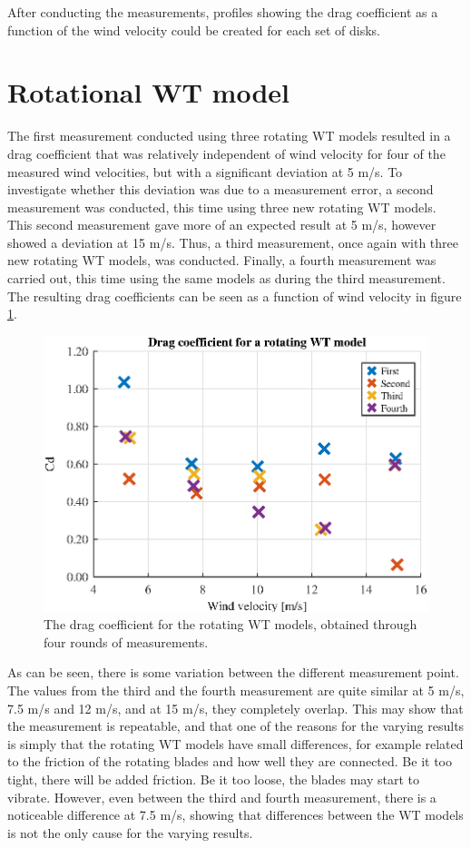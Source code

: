After conducting the measurements, profiles showing the drag coefficient as a function of the wind velocity could be created for each set of disks. 




\section{Rotational WT model}

The first measurement conducted using three rotating WT models resulted in a drag coefficient that was relatively independent of wind velocity for four of the measured wind velocities, but with a significant deviation at 5 m/s. To investigate whether this deviation was due to a measurement error, a second measurement was conducted, this time using three new rotating WT models. This second measurement gave more of an expected result at 5 m/s, however showed a deviation at 15 m/s. Thus, a third measurement, once again with three new rotating WT models, was conducted. Finally, a fourth measurement was carried out, this time using the same models as during the third measurement. The resulting drag coefficients can be seen as a function of wind velocity in figure \ref{fig:RotationalCD}.

\begin{figure}[h!]
    \centering
    \includegraphics[width=\linewidth]{0_Images/RotationalCD.eps}
    \caption{The drag coefficient for the rotating WT models, obtained through four rounds of measurements.}
    \label{fig:RotationalCD}
\end{figure}

As can be seen, there is some variation between the different measurement point. The values from the third and the fourth measurement are quite similar at 5 m/s, 7.5 m/s and 12 m/s, and at 15 m/s, they completely overlap. This may show that the measurement is repeatable, and that one of the reasons for the varying results is simply that the rotating WT models have small differences, for example related to the friction of the rotating blades and how well they are connected. Be it too tight, there will be added friction. Be it too loose, the blades may start to vibrate. However, even between the third and fourth measurement, there is a noticeable difference at 7.5 m/s, showing that differences between the WT models is not the only cause for the varying results. 

